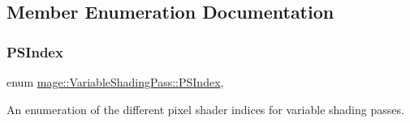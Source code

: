 \subsection{Member Enumeration Documentation}
\hypertarget{classmage_1_1_variable_shading_pass_a49519e421ac5be93136d9efdbf075d4a}{}\label{classmage_1_1_variable_shading_pass_a49519e421ac5be93136d9efdbf075d4a} 
\subsubsection{\texorpdfstring{P\+S\+Index}{PSIndex}}
{\footnotesize\ttfamily enum \hyperlink{classmage_1_1_variable_shading_pass_a49519e421ac5be93136d9efdbf075d4a}{mage\+::\+Variable\+Shading\+Pass\+::\+P\+S\+Index}\hspace{0.3cm}{\ttfamily [strong]}, {\ttfamily [private]}}

An enumeration of the different pixel shader indices for variable shading passes.

